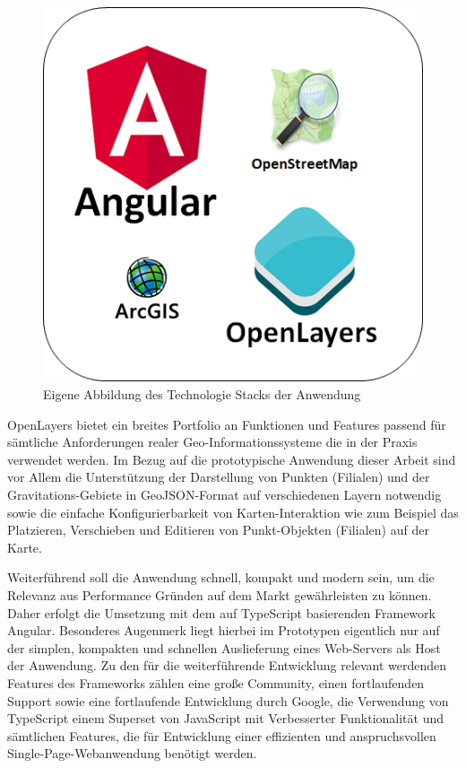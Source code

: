 \begin{figure}[H]
	\centering
	\includegraphics[]{resources/images/tech_stack.png}
	\caption{Eigene Abbildung des Technologie Stacks der Anwendung}
	\label{img:tech_stack}
\end{figure}

OpenLayers bietet ein breites Portfolio an Funktionen und Features passend für sämtliche Anforderungen realer Geo-Informationssysteme die in der Praxis verwendet werden. Im Bezug auf die prototypische Anwendung dieser Arbeit sind vor Allem die Unterstützung der Darstellung von Punkten (Filialen) und der Gravitations-Gebiete in GeoJSON-Format auf verschiedenen Layern notwendig sowie die einfache Konfigurierbarkeit von Karten-Interaktion wie zum Beispiel das Platzieren, Verschieben und Editieren von Punkt-Objekten (Filialen) auf der Karte.

Weiterführend soll die Anwendung schnell, kompakt und modern sein, um die Relevanz aus Performance Gründen auf dem Markt gewährleisten zu können. Daher erfolgt die Umsetzung mit dem auf TypeScript basierenden Framework Angular. Besonderes Augenmerk liegt hierbei im Prototypen eigentlich nur auf der simplen, kompakten und schnellen Auslieferung eines Web-Servers als Host der Anwendung. Zu den für die weiterführende Entwicklung relevant werdenden Features des Frameworks zählen eine große Community, einen fortlaufenden Support sowie eine fortlaufende Entwicklung durch Google, die Verwendung von TypeScript einem Superset von JavaScript mit Verbesserter Funktionalität und sämtlichen Features, die für Entwicklung einer effizienten und anspruchsvollen Single-Page-Webanwendung benötigt werden. 